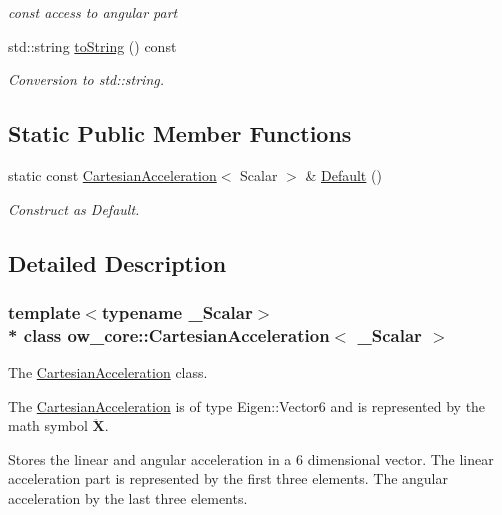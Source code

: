 \begin{DoxyCompactItemize}
\begin{DoxyCompactList}\small\item\em const access to angular part \end{DoxyCompactList}\item 
std\+::string \hyperlink{classow__core_1_1CartesianAcceleration_a6b9003f22a7422ae469e360fd5919a62}{to\+String} () const \hypertarget{classow__core_1_1CartesianAcceleration_a6b9003f22a7422ae469e360fd5919a62}{}\label{classow__core_1_1CartesianAcceleration_a6b9003f22a7422ae469e360fd5919a62}

\begin{DoxyCompactList}\small\item\em Conversion to std\+::string. \end{DoxyCompactList}\end{DoxyCompactItemize}
\subsection*{Static Public Member Functions}
\begin{DoxyCompactItemize}
\item 
static const \hyperlink{classow__core_1_1CartesianAcceleration}{Cartesian\+Acceleration}$<$ Scalar $>$ \& \hyperlink{classow__core_1_1CartesianAcceleration_a00e6c34ddc0c10a6e1c591070baa1cfb}{Default} ()
\begin{DoxyCompactList}\small\item\em Construct as Default. \end{DoxyCompactList}\end{DoxyCompactItemize}


\subsection{Detailed Description}
\subsubsection*{template$<$typename \+\_\+\+Scalar$>$\\*
class ow\+\_\+core\+::\+Cartesian\+Acceleration$<$ \+\_\+\+Scalar $>$}

The \hyperlink{classow__core_1_1CartesianAcceleration}{Cartesian\+Acceleration} class. 

The \hyperlink{classow__core_1_1CartesianAcceleration}{Cartesian\+Acceleration} is of type Eigen\+::\+Vector6 and is represented by the math symbol $\ddot{\mathbf{X}}$.

Stores the linear and angular acceleration in a 6 dimensional vector. The linear acceleration part is represented by the first three elements. The angular acceleration by the last three elements. 

